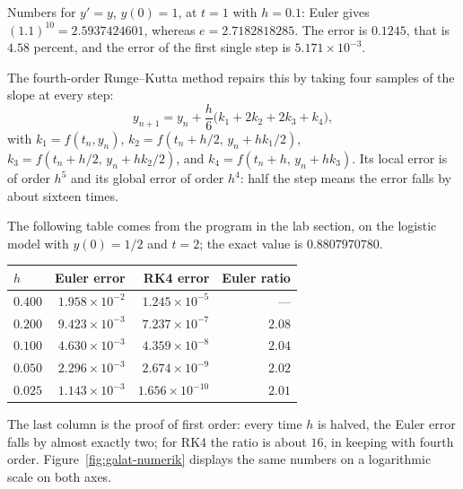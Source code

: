 Numbers for $y'=y$, $y(0)=1$, at $t=1$ with $h=0.1$: Euler gives
$(1.1)^{10}=2.5937424601$, whereas $e=2.7182818285$. The error is $0.1245$, that is
$4.58$ percent, and the error of the first single step is $5.171\times10^{-3}$.

The fourth-order Runge--Kutta method repairs this by taking four samples of the slope at
every step:
\[
y_{n+1}=y_{n}+\frac{h}{6}\bigl(k_{1}+2k_{2}+2k_{3}+k_{4}\bigr),
\]
with $k_{1}=f(t_{n},y_{n})$, $k_{2}=f(t_{n}+h/2,\,y_{n}+hk_{1}/2)$,
$k_{3}=f(t_{n}+h/2,\,y_{n}+hk_{2}/2)$, and $k_{4}=f(t_{n}+h,\,y_{n}+hk_{3})$.
Its local error is of order $h^{5}$ and its global error of order $h^{4}$: half the step
means the error falls by about sixteen times.

The following table comes from the program in the lab section, on the logistic model with
$y(0)=1/2$ and $t=2$; the exact value is $0.8807970780$.

\begin{center}
{\small
\begin{tabular}{lrrr}
\hline
$h$ & Euler error & RK4 error & Euler ratio \\
\hline
$0.400$ & $1.958\times10^{-2}$ & $1.245\times10^{-5}$ & --- \\
$0.200$ & $9.423\times10^{-3}$ & $7.237\times10^{-7}$ & $2.08$ \\
$0.100$ & $4.630\times10^{-3}$ & $4.359\times10^{-8}$ & $2.04$ \\
$0.050$ & $2.296\times10^{-3}$ & $2.674\times10^{-9}$ & $2.02$ \\
$0.025$ & $1.143\times10^{-3}$ & $1.656\times10^{-10}$ & $2.01$ \\
\hline
\end{tabular}}
\end{center}

The last column is the proof of first order: every time $h$ is halved, the Euler error falls
by almost exactly two; for RK4 the ratio is about $16$, in keeping with fourth order.
Figure~\ref{fig:galat-numerik} displays the same numbers on a logarithmic scale on both
axes.

